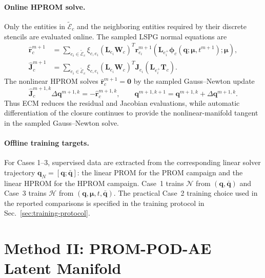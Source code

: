 \documentclass[11pt]{article}
\begin{document}
\paragraph{Online HPROM solve.}
Only the entities in $\widetilde{\mathcal E}_c$ and the neighboring entities
required by their discrete stencils are evaluated online. The sampled LSPG
normal equations are
\begin{equation}
\begin{aligned}
\widehat{\mathbf r}_c^{m+1}
&=
\sum_{e_i\in\widetilde{\mathcal E}_c}\xi_{c,e_i}
\left(\mathbf L_{e_i}\mathbf W_c\right)^T
\mathbf r_{e_i}^{m+1}
\!\left(\mathbf L_{e_i^+}\boldsymbol\phi_c(\mathbf q;\bm\mu,t^{m+1});\bm\mu\right),\\
\widehat{\mathbf J}_c^{m+1}
&=
\sum_{e_i\in\widetilde{\mathcal E}_c}\xi_{c,e_i}
\left(\mathbf L_{e_i}\mathbf W_c\right)^T
\mathbf J_{e_i}
\left(\mathbf L_{e_i^+}\mathbf T_c\right).
\end{aligned}
\label{eq:ann-ecm-online-normal-equations}
\end{equation}
The nonlinear HPROM solves $\widehat{\mathbf r}_c^{m+1}=\mathbf0$ by the
sampled Gauss--Newton update
\begin{equation}
\widehat{\mathbf J}_c^{m+1,k}\Delta\mathbf q^{m+1,k}
=-\widehat{\mathbf r}_c^{m+1,k},
\qquad
\mathbf q^{m+1,k+1}
=\mathbf q^{m+1,k}+\Delta\mathbf q^{m+1,k}.
\label{eq:ann-ecm-online}
\end{equation}
Thus ECM reduces the residual and Jacobian evaluations, while automatic
differentiation of the closure continues to provide the nonlinear-manifold
tangent in the sampled Gauss--Newton solve.

\paragraph{Offline training targets.}
For Cases 1--3, supervised data are extracted from the corresponding linear
solver trajectory $\mathbf q_N=[\mathbf q;\bar{\mathbf q}]$: the linear PROM
for the PROM campaign and the linear HPROM for the HPROM campaign. Case~1 trains $\mathcal N$ from
$(\mathbf q,\bar{\mathbf q})$ and Case~3 trains $\mathcal H$ from
$(\mathbf q,\bm\mu,t,\bar{\mathbf q})$.  The practical Case~2 training
choice used in the reported comparisons is specified in the training protocol
in Sec.~\ref{sec:training-protocol}.

\section{Method II: PROM-POD-AE Latent Manifold}
\label{sec:method-podae}
\end{document}
